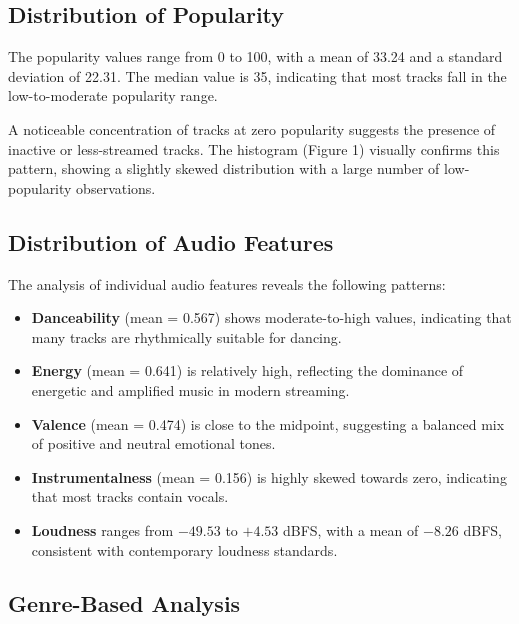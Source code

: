 \documentclass[12pt,a4paper]{article}
\begin{document}
\subsection{Distribution of Popularity}

The popularity values range from 0 to 100, with a mean of 33.24 and a
standard deviation of 22.31. The median value is 35, indicating that most
tracks fall in the low-to-moderate popularity range.

A noticeable concentration of tracks at zero popularity suggests the
presence of inactive or less-streamed tracks. The histogram (Figure 1)
visually confirms this pattern, showing a slightly skewed distribution
with a large number of low-popularity observations.

\subsection{Distribution of Audio Features}

The analysis of individual audio features reveals the following patterns:

\begin{itemize}
  \item \textbf{Danceability} (mean = 0.567) shows moderate-to-high values,
        indicating that many tracks are rhythmically suitable for dancing.
        
  \item \textbf{Energy} (mean = 0.641) is relatively high, reflecting the
        dominance of energetic and amplified music in modern streaming.
        
  \item \textbf{Valence} (mean = 0.474) is close to the midpoint,
        suggesting a balanced mix of positive and neutral emotional tones.
        
  \item \textbf{Instrumentalness} (mean = 0.156) is highly skewed towards zero,
        indicating that most tracks contain vocals.
        
  \item \textbf{Loudness} ranges from $-49.53$ to $+4.53$ dBFS, with a mean
        of $-8.26$ dBFS, consistent with contemporary loudness standards.
\end{itemize}

\subsection{Genre-Based Analysis}
\end{document}
